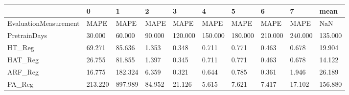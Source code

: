 \begin{tabular}{llllllllll}
\toprule
{} &       0 &       1 &      2 &       3 &       4 &       5 &       6 &       7 &    mean \\
\midrule
EvaluationMeasurement &    MAPE &    MAPE &   MAPE &    MAPE &    MAPE &    MAPE &    MAPE &    MAPE &     NaN \\
PretrainDays          &  30.000 &  60.000 & 90.000 & 120.000 & 150.000 & 180.000 & 210.000 & 240.000 & 135.000 \\
HT\_Reg                &  69.271 &  85.636 &  1.353 &   0.348 &   0.711 &   0.771 &   0.463 &   0.678 &  19.904 \\
HAT\_Reg               &  26.755 &  81.855 &  1.397 &   0.345 &   0.711 &   0.771 &   0.463 &   0.678 &  14.122 \\
ARF\_Reg               &  16.775 & 182.324 &  6.359 &   0.321 &   0.644 &   0.785 &   0.361 &   1.946 &  26.189 \\
PA\_Reg                & 213.220 & 897.989 & 84.952 &  21.126 &   5.615 &   7.621 &   7.417 &  17.102 & 156.880 \\
\bottomrule
\end{tabular}
